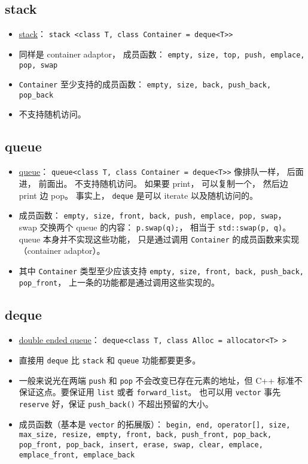 \subsection{stack}
\begin{itemize}
\item \href{https://cplusplus.com/reference/stack/stack/}{stack}： \verb`stack <class T, class Container = deque<T>>`
\item 同样是 container adaptor， 成员函数： \verb`empty, size, top, push, emplace, pop, swap`
\item \verb`Container` 至少支持的成员函数： \verb`empty, size, back, push_back, pop_back`
\item 不支持随机访问。
\end{itemize}

\subsection{queue}
\begin{itemize}
\item \href{https://cplusplus.com/reference/queue/queue/}{queue}： \verb`queue<class T, class Container = deque<T>>` 像排队一样， 后面进， 前面出。 不支持随机访问。 如果要 print， 可以复制一个， 然后边 print 边 pop。 事实上， \verb`deque` 是可以 iterate 以及随机访问的。
\item 成员函数： \verb`empty, size, front, back, push, emplace, pop, swap`， swap 交换两个 queue 的内容： \verb`p.swap(q);`， 相当于 \verb`std::swap(p, q)`。 queue 本身并不实现这些功能， 只是通过调用 \verb`Container` 的成员函数来实现（container adaptor）。
\item 其中 \verb`Container` 类型至少应该支持 \verb`empty, size, front, back, push_back, pop_front`， 上一条的功能都是通过调用这些实现的。
\end{itemize}

\subsection{deque}
\begin{itemize}
\item \href{https://cplusplus.com/reference/deque/deque/}{double ended queue}： \verb`deque<class T, class Alloc = allocator<T> >`
\item 直接用 \verb`deque` 比 \verb`stack` 和 \verb`queue` 功能都要更多。
\item 一般来说光在两端 \verb`push` 和 \verb`pop` 不会改变已存在元素的地址，但 C++ 标准不保证这点。要保证用 \verb`list` 或者 \verb`forward_list`。 也可以用 \verb`vector` 事先 \verb`reserve` 好，保证 \verb`push_back()` 不超出预留的大小。
\item 成员函数（基本是 \verb`vector` 的拓展版）： \verb`begin, end, operator[], size, max_size, resize, empty, front, back, push_front, pop_back, pop_front, pop_back, insert, erase, swap, clear, emplace, emplace_front, emplace_back`
\end{itemize}

